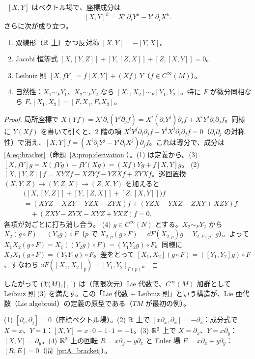 \begin{prop}\label{A:prop:bracket}
\tP\ $[X,Y]$ はベクトル場で、座標成分は
\begin{equation}\label{A:eq:bracket}
[X,Y]^k=X^i\,\partial_iY^k-Y^i\,\partial_iX^k .
\end{equation}
さらに次が成り立つ。
\begin{enumerate}
\item 双線形（$\mathbb R$ 上）かつ反対称 $[X,Y]=-[Y,X]$。
\item Jacobi 恒等式 $[X,[Y,Z]]+[Y,[Z,X]]+[Z,[X,Y]]=0$。
\item Leibniz 則 $[X,fY]=f[X,Y]+(Xf)\,Y$（$f\in C^\infty(M)$）。
\item 自然性：$X_1\sim_FY_1$、$X_2\sim_FY_2$ なら $[X_1,X_2]\sim_F[Y_1,Y_2]$。特に $F$ が微分同相なら $F_*[X_1,X_2]=[F_*X_1,F_*X_2]$。
\end{enumerate}
\end{prop}
\begin{proof}
局所座標で $X(Yf)=X^i\partial_i(Y^j\partial_jf)=X^i(\partial_iY^j)\partial_jf+X^iY^j\partial_i\partial_jf$。同様に $Y(Xf)$ を書いて引くと、2 階の項 $X^iY^j\partial_i\partial_jf-Y^iX^j\partial_i\partial_jf=0$（$\partial_i\partial_j$ の対称性）で消え、$[X,Y]f=(X^i\partial_iY^j-Y^i\partial_iX^j)\partial_jf$。これは導分で、成分は \eqref{A:eq:bracket}（命題~\ref{A:prop:derivation}）。(1) は定義から。(3) $[X,fY]g=X(fYg)-fY(Xg)=(Xf)Yg+f[X,Y]g$。
(2) $[X,[Y,Z]]f=XYZf-XZYf-YZXf+ZYXf$。巡回置換 $(X,Y,Z)\to(Y,Z,X)\to(Z,X,Y)$ を加えると
\begin{align*}
&\bigl([X,[Y,Z]]+[Y,[Z,X]]+[Z,[X,Y]]\bigr)f\\
&=(XYZ-XZY-YZX+ZYX)f+(YZX-YXZ-ZXY+XZY)f\\
&\quad+(ZXY-ZYX-XYZ+YXZ)f=0,
\end{align*}
各項が対ごとに打ち消し合う。
(4) $g\in C^\infty(N)$ とする。$X_2\sim_FY_2$ から $X_2(g\circ F)=(Y_2g)\circ F$（$p$ で $X_{2,p}(g\circ F)=\dd F(X_{2,p})g=Y_{2,F(p)}g$）。よって $X_1X_2(g\circ F)=X_1((Y_2g)\circ F)=(Y_1Y_2g)\circ F$。同様に $X_2X_1(g\circ F)=(Y_2Y_1g)\circ F$。差をとって $[X_1,X_2](g\circ F)=([Y_1,Y_2]g)\circ F$、すなわち $\dd F([X_1,X_2]_p)=[Y_1,Y_2]_{F(p)}$。
\end{proof}

したがって $(\mathfrak X(M),[\,,\,])$ は（無限次元）Lie 代数で、$C^\infty(M)$ 加群として Leibniz 則 (3) を満たす。この「Lie 代数 $+$ Leibniz 則」という構造が、Lie 亜代数（Lie algebroid）の定義の原型である（$TM$ が最初の例）。

\begin{ex}\label{A:ex:brackets}
(1) $[\partial_i,\partial_j]=0$（座標ベクトル場）。(2) $\mathbb R$ 上で $[x\partial_x,\partial_x]=-\partial_x$：成分式で $X=x$、$Y=1$：$[X,Y]=x\cdot0-1\cdot1=-1$。(3) $\mathbb R^2$ 上で $X=\partial_x$、$Y=x\partial_y$：$[X,Y]=\partial_y$。(4) $\mathbb R^2$ 上の回転 $R=x\partial_y-y\partial_x$ と Euler 場 $E=x\partial_x+y\partial_y$：$[R,E]=0$（問~\ref{pr:A_bracket}）。
\end{ex}

